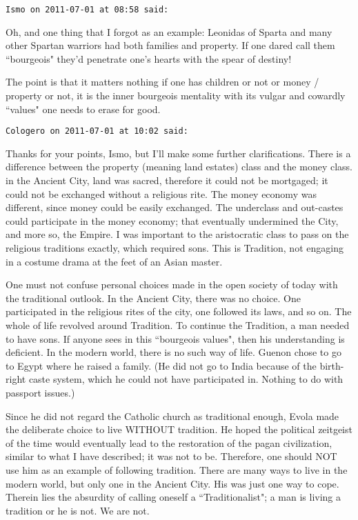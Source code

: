 \begin{footnotesize}
\begin{sffamily}
\hfill

\texttt{Ismo on 2011-07-01 at 08:58 said: }

Oh, and one thing that I forgot as an example: Leonidas of Sparta and many other Spartan warriors had both families and property. If one dared call them ``bourgeois" they'd penetrate one's hearts with the spear of destiny!

The point is that it matters nothing if one has children or not or money / property or not, it is the inner bourgeois mentality with its vulgar and cowardly ``values" one needs to erase for good.


\hfill

\texttt{Cologero on 2011-07-01 at 10:02 said: }

Thanks for your points, Ismo, but I'll make some further clarifications. There is a difference between the property (meaning land estates) class and the money class. in the Ancient City, land was sacred, therefore it could not be mortgaged; it could not be exchanged without a religious rite. The money economy was different, since money could be easily exchanged. The underclass and out-castes could participate in the money economy; that eventually undermined the City, and more so, the Empire. I was important to the aristocratic class to pass on the religious traditions exactly, which required sons. This is Tradition, not engaging in a costume drama at the feet of an Asian master. 

One must not confuse personal choices made in the open society of today with the traditional outlook. In the Ancient City, there was no choice. One participated in the religious rites of the city, one followed its laws, and so on. The whole of life revolved around Tradition. To continue the Tradition, a man needed to have sons. If anyone sees in this ``bourgeois values", then his understanding is deficient. In the modern world, there is no such way of life. Guenon chose to go to Egypt where he raised a family. (He did not go to India because of the birth-right caste system, which he could not have participated in. Nothing to do with passport issues.)

Since he did not regard the Catholic church as traditional enough, Evola made the deliberate choice to live WITHOUT tradition. He hoped the political zeitgeist of the time would eventually lead to the restoration of the pagan civilization, similar to what I have described; it was not to be. Therefore, one should NOT use him as an example of following tradition. There are many ways to live in the modern world, but only one in the Ancient City. His was just one way to cope. Therein lies the absurdity of calling oneself a ``Traditionalist"; a man is living a tradition or he is not. We are not.


\end{sffamily}
\end{footnotesize}
